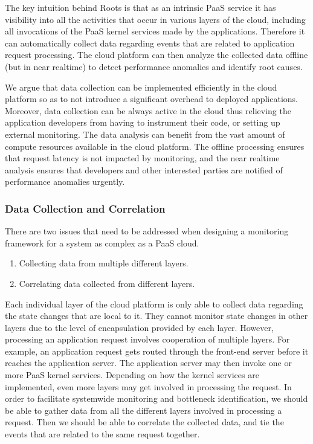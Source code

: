 The key intuition behind Roots is that as an intrinsic PaaS service
it has visibility into all the activities that occur in various layers of the cloud,
including all invocations of the PaaS kernel services made by the applications.
Therefore it can automatically collect
 data regarding events that are related to application request processing. 
The cloud platform can then analyze the collected data offline (but in near realtime) to detect 
performance anomalies and identify root causes.

We argue that data collection can be implemented efficiently in the cloud platform so as to not
introduce a significant overhead to deployed applications.
Moreover, data collection can be always active in the cloud thus relieving the application developers
from having to instrument their code, or setting up external monitoring.
The data analysis can benefit from the vast amount of compute
resources available in the cloud platform. The offline processing ensures that request
latency is not impacted by monitoring, and the near realtime analysis ensures that developers
and other interested parties are notified of performance anomalies urgently. 

\subsubsection{Data Collection and Correlation}

There are two issues that need to be addressed when designing a monitoring framework for
a system as complex as a PaaS cloud.
\begin{enumerate}
\item Collecting data from multiple different layers.
\item Correlating data collected from different layers.
\end{enumerate}

Each individual layer of the cloud platform is only able to collect data regarding the
state changes that are local to it. They cannot monitor state changes
in other layers due to the level of encapsulation provided by each layer. However,
processing an application request involves cooperation of multiple 
layers. For example, an application request gets routed through the front-end server before
it reaches the application server. The application server may then invoke one or more PaaS kernel
services. Depending on how the kernel services are implemented,
even more layers may get involved in processing the request. 
In order to facilitate systemwide monitoring and
bottleneck identification, we should be able to gather data from all the different layers involved
in processing a request. Then we should be able to correlate the collected data, and tie the events that
are related to the same request together.

